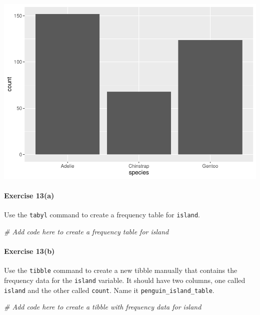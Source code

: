 \documentclass[
]{book}
\newenvironment{Shaded}{\begin{snugshade}}{\end{snugshade}}
\newcommand{\CommentTok}[1]{\textcolor[rgb]{0.56,0.35,0.01}{\textit{#1}}}
\begin{document}
\includegraphics{intro_stats_files/figure-latex/unnamed-chunk-73-1.pdf}

\hypertarget{exercise-13a}{%
\paragraph*{Exercise 13(a)}\label{exercise-13a}}

Use the \texttt{tabyl} command to create a frequency table for \texttt{island}.

\begin{Shaded}
\begin{Highlighting}[]
\CommentTok{\# Add code here to create a frequency table for island}
\end{Highlighting}
\end{Shaded}

\hypertarget{exercise-13b}{%
\paragraph*{Exercise 13(b)}\label{exercise-13b}}

Use the \texttt{tibble} command to create a new tibble manually that contains the frequency data for the \texttt{island} variable. It should have two columns, one called \texttt{island} and the other called \texttt{count}. Name it \texttt{penguin\_island\_table}.

\begin{Shaded}
\begin{Highlighting}[]
\CommentTok{\# Add code here to create a tibble with frequency data for island}
\end{Highlighting}
\end{Shaded}
\end{document}

